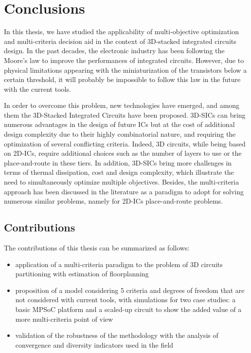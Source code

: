 \chapter{Conclusions}
\label{cha:conclusions}
\fancyhead[RE]{\bfseries\leftmark}

In this thesis, we have studied the applicability of multi-objective optimization and multi-criteria decision aid in the context of 3D-stacked integrated circuits design. In the past decades, the electronic industry has been following the Moore’s law to improve the performances of integrated circuits. However, due to physical limitations appearing with the miniaturization of the transistors below a certain threshold, it will probably be impossible to follow this law in the future with the current tools.

In order to overcome this problem, new technologies have emerged, and among them the 3D-Stacked Integrated Circuits have been proposed. 3D-SICs can bring numerous advantages in the design of future ICs but at the cost of additional design complexity due to their highly combinatorial nature, and requiring the optimization of several conflicting criteria. Indeed, 3D circuits, while being based on 2D-ICs, require additional choices such as the number of layers to use or the place-and-route in these tiers. In addition, 3D-SICs bring more challenges in terms of thermal dissipation, cost and design complexity, which illustrate the need to simultaneously optimize multiple objectives. Besides, the multi-criteria approach has been discussed in the literature as a paradigm to adopt for solving numerous similar problems, namely for 2D-ICs place-and-route problems.

\section*{Contributions}

The contributions of this thesis can be summarized as follows:
\begin{itemize}
\item application of a multi-criteria paradigm to the problem of 3D circuits partitioning with estimation of floorplanning
\item proposition of a model considering 5 criteria and degrees of freedom that are not considered with current tools, with simulations for two case studies: a basic MPSoC platform and a scaled-up circuit to show the added value of a more multi-criteria point of view
\item validation of the robustness of the methodology with the analysis of convergence and diversity indicators used in the field
\end{itemize}

